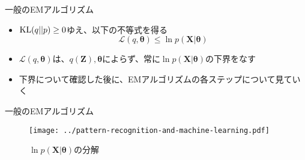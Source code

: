 \documentclass[dvipdfmx,notheorems,t]{beamer}
\begin{document}
\begin{frame}{一般のEMアルゴリズム}
\begin{itemize}
\begin{itemize}
		\item $\operatorname{KL} (q || p) \ge 0$ゆえ、以下の不等式を得る
		\begin{equation}
			\mathcal{L}(q, \bm{\theta}) \le \ln p(\bm{X} | \bm{\theta})
		\end{equation}
		
		\item $\mathcal{L}(q, \bm{\theta})$は、$q(\bm{Z}), \bm{\theta}$によらず、常に$\ln p(\bm{X} | \bm{\theta})$の\alert{下界}をなす
		\newline
		\item 下界について確認した後に、EMアルゴリズムの各ステップについて見ていく
	\end{itemize}
\end{itemize}

\end{frame}

\begin{frame}{一般のEMアルゴリズム}

\begin{figure}[h]
	\centering
	\texttt{[image: ../pattern-recognition-and-machine-learning.pdf]}
	\caption{$\ln p(\bm{X} | \bm{\theta})$の分解}
\end{figure}

\end{frame}
\end{document}
